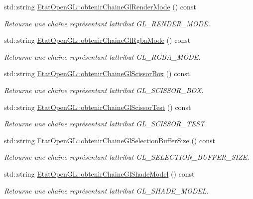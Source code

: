 \begin{DoxyCompactItemize}
std\+::string \hyperlink{group__utilitaire_ga64d9bf10216007aeb301d43ac14f82b4}{Etat\+Open\+G\+L\+::obtenir\+Chaine\+Gl\+Render\+Mode} () const 
\begin{DoxyCompactList}\small\item\em Retourne une chaîne représentant l\textquotesingle{}attribut G\+L\+\_\+\+R\+E\+N\+D\+E\+R\+\_\+\+M\+O\+D\+E. \end{DoxyCompactList}\item 
std\+::string \hyperlink{group__utilitaire_ga1596849dfe7b4606e0fc3ff9fbe00489}{Etat\+Open\+G\+L\+::obtenir\+Chaine\+Gl\+Rgba\+Mode} () const 
\begin{DoxyCompactList}\small\item\em Retourne une chaîne représentant l\textquotesingle{}attribut G\+L\+\_\+\+R\+G\+B\+A\+\_\+\+M\+O\+D\+E. \end{DoxyCompactList}\item 
std\+::string \hyperlink{group__utilitaire_ga58f683f150a231ec839aed3f79cd3ef2}{Etat\+Open\+G\+L\+::obtenir\+Chaine\+Gl\+Scissor\+Box} () const 
\begin{DoxyCompactList}\small\item\em Retourne une chaîne représentant l\textquotesingle{}attribut G\+L\+\_\+\+S\+C\+I\+S\+S\+O\+R\+\_\+\+B\+O\+X. \end{DoxyCompactList}\item 
std\+::string \hyperlink{group__utilitaire_ga80ed5d63c763521b6db8166033008a6a}{Etat\+Open\+G\+L\+::obtenir\+Chaine\+Gl\+Scissor\+Test} () const 
\begin{DoxyCompactList}\small\item\em Retourne une chaîne représentant l\textquotesingle{}attribut G\+L\+\_\+\+S\+C\+I\+S\+S\+O\+R\+\_\+\+T\+E\+S\+T. \end{DoxyCompactList}\item 
std\+::string \hyperlink{group__utilitaire_gae47f276d2d1d8233f544fca09b062e63}{Etat\+Open\+G\+L\+::obtenir\+Chaine\+Gl\+Selection\+Buffer\+Size} () const 
\begin{DoxyCompactList}\small\item\em Retourne une chaîne représentant l\textquotesingle{}attribut G\+L\+\_\+\+S\+E\+L\+E\+C\+T\+I\+O\+N\+\_\+\+B\+U\+F\+F\+E\+R\+\_\+\+S\+I\+Z\+E. \end{DoxyCompactList}\item 
std\+::string \hyperlink{group__utilitaire_gaef3c863fd714bcd6607a7fe129c6c1d4}{Etat\+Open\+G\+L\+::obtenir\+Chaine\+Gl\+Shade\+Model} () const 
\begin{DoxyCompactList}\small\item\em Retourne une chaîne représentant l\textquotesingle{}attribut G\+L\+\_\+\+S\+H\+A\+D\+E\+\_\+\+M\+O\+D\+E\+L. \end{DoxyCompactList}\item 

\end{DoxyCompactItemize}
